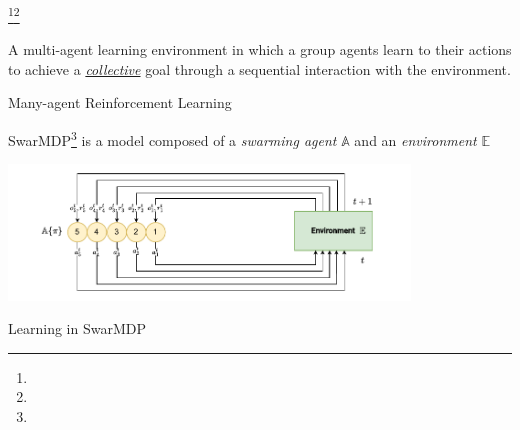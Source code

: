 \documentclass[presentation, 8pt,169]{beamer}\mode<presentation>{\usetheme{AMSBolognaFC}}
\begin{document}
\begin{frame}{}
  \begin{center}
\huge{\footnote{\tiny{}}}\footnote{\tiny{}}
  \end{center}
  \begin{center}
    \large{A multi-agent learning environment in which a  group agents learn to  their actions to achieve a \emph{\underline{collective}} goal through a sequential interaction with the environment}.
  \end{center}
\end{frame} 
\begin{frame}{Many-agent Reinforcement Learning}

SwarMDP\footnote{} is a model composed of a \emph{swarming agent} $\mathbb{A}$ and an \emph{environment} $\mathbb{E}$
\begin{center}
\includegraphics[width=0.8\textwidth]{img/swarmdp.drawio.pdf}
\end{center}
\begin{block}{Learning in SwarMDP}
  \begin{itemize}

\end{itemize}
\end{block}
\end{frame}
\end{document}
